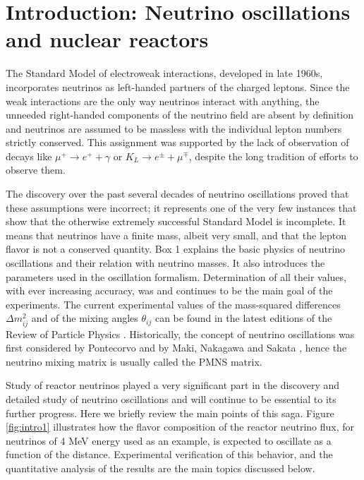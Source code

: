\section{Introduction: Neutrino oscillations and nuclear reactors} 
\label{sec:intro}

The Standard Model of electroweak interactions,
developed in late 1960s, incorporates neutrinos as left-handed partners of the charged leptons. Since the weak interactions are the
only way neutrinos interact with anything, the unneeded right-handed components of the neutrino field are absent 
by definition and neutrinos are assumed to be massless with the individual lepton numbers strictly conserved.
This assignment was supported by the lack of observation of decays like 
$\mu^+ \rightarrow e^+ + \gamma$ or $K_L \rightarrow e^{\pm} + \mu^{\mp}$,
despite the long tradition of efforts to observe them.

The discovery over the past several decades
of neutrino oscillations proved that these assumptions were incorrect; it
represents one of the very few instances that show that the otherwise
extremely successful Standard Model is incomplete. It means that
neutrinos have a finite mass, albeit very small, and that the lepton flavor is not a conserved quantity.
Box 1 explains the basic physics of neutrino oscillations and their relation with neutrino masses. It
also introduces the parameters used in the oscillation formalism. Determination of all their values,
with ever increasing accuracy,
was and continues to be the main goal of the experiments.
The current experimental values of the mass-squared differences $\Delta m^2_{ij}$ and of the mixing angles $\theta_{ij}$ can be found
in the latest editions of the Review of Particle Physics \cite{PDG14}.
Historically, the concept of neutrino oscillations was first considered by Pontecorvo \cite{Pontecorvo57, Pontecorvo58}
and by Maki, Nakagawa and Sakata \cite{MNS62}, hence the neutrino mixing matrix is usually called the PMNS matrix.

Study of reactor neutrinos played a very significant part in the discovery and detailed study of neutrino oscillations and will continue 
to be essential to its further progress. Here we briefly review
the main points of this saga. Figure \ref{fig:intro1} illustrates how the flavor composition of the reactor neutrino flux, for neutrinos of 4 MeV energy
used as an example, is expected to oscillate as a function of the distance. Experimental verification of this behavior, and the quantitative analysis of the
results are the main topics discussed below.

